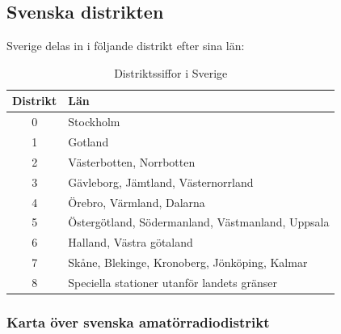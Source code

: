 \subsection{Svenska distrikten}

Sverige delas in i följande distrikt efter sina län:

\begin{table}[h]
	\centering
\begin{tabular}{cl}
	\textbf{Distrikt} & \textbf{Län}                                     \\ \hline %
	      0        & Stockholm                                        \\
	      1        & Gotland                                          \\
	      2        & Västerbotten, Norrbotten                         \\
	      3        & Gävleborg, Jämtland, Västernorrland              \\
	      4        & Örebro, Värmland, Dalarna                        \\
	      5        & Östergötland, Södermanland, Västmanland, Uppsala \\
	      6        & Halland, Västra götaland                         \\
	      7        & Skåne, Blekinge, Kronoberg, Jönköping, Kalmar    \\
	      8        & Speciella stationer utanför landets gränser
\end{tabular}
\caption{Distriktssiffor i Sverige}
\end{table}

\subsubsection{Karta över svenska amatörradiodistrikt}

